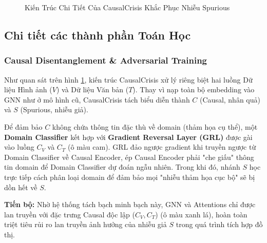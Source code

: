 \documentclass[12pt,a4paper]{article}
\begin{document}
\begin{figure}[H]
{
}
\caption{Kiến Trúc Chi Tiết Của CausalCrisis Khắc Phục Nhiễu Spurious}
\label{fig:causalcrisis}
\end{figure}

\subsection{Chi tiết các thành phần Toán Học}

\subsubsection{Causal Disentanglement \& Adversarial Training}
Như quan sát trên hình \ref{fig:causalcrisis}, kiến trúc CausalCrisis xử lý riêng biệt hai luồng Dữ liệu Hình ảnh ($V$) và Dữ liệu Văn bản ($T$). 
Thay vì nạp toàn bộ embedding vào GNN như ở mô hình cũ, CausalCrisis tách biểu diễn thành $C$ (Causal, nhân quả) và $S$ (Spurious, nhiễu giả). 

Để đảm bảo $C$ không chứa thông tin đặc thù về domain (thảm họa cụ thể), một \textbf{Domain Classifier} kết hợp với \textbf{Gradient Reversal Layer (GRL)} được gài vào luồng $C_{V}$ và $C_{T}$ (ô màu cam). GRL đảo ngược gradient khi truyền ngược từ Domain Classifier về Causal Encoder, ép Causal Encoder phải "che giấu" thông tin domain để Domain Classifier dự đoán ngẫu nhiên. Trong khi đó, nhánh $S$ học trực tiếp cách phân loại domain để đảm bảo mọi "nhiễu thảm họa cục bộ" sẽ bị dồn hết về $S$.

\textbf{Tiến bộ:} Nhờ hệ thống tách bạch minh bạch này, GNN và Attentions chỉ được lan truyền với đặc trưng Causal độc lập ($C_{V}, C_{T}$) (ô màu xanh lá), hoàn toàn triệt tiêu rủi ro lan truyền ảnh hưởng của nhiễu giả $S$ trong quá trình tích hợp đồ thị.
\end{document}
